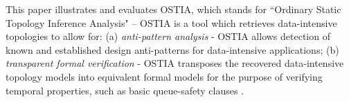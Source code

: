 %
%

This paper illustrates and evaluates OSTIA, which stands for ``Ordinary Static Topology Inference Analysis" -- OSTIA is a tool which retrieves data-intensive topologies to allow for: (a) \emph{anti-pattern analysis} - OSTIA allows detection of known and established design anti-patterns for data-intensive applications; (b) \emph{transparent formal verification} - OSTIA transposes the recovered data-intensive topology models into equivalent formal models for the purpose of verifying temporal properties, such as basic queue-safety clauses \cite{icsoft}. 

